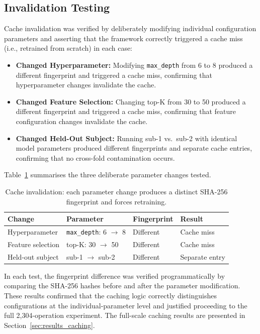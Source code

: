 \subsection{Invalidation Testing}

Cache invalidation was verified by deliberately modifying individual
configuration parameters and asserting that the framework correctly triggered
a cache miss (i.e., retrained from scratch) in each case:

\begin{itemize}
\item \textbf{Changed Hyperparameter:} Modifying \verb|max_depth| from 6 to 8
 produced a different fingerprint and triggered a cache miss, confirming
 that hyperparameter changes invalidate the cache.
\item \textbf{Changed Feature Selection:} Changing top-K from 30 to 50 produced
 a different fingerprint and triggered a cache miss, confirming that
 feature configuration changes invalidate the cache.
\item \textbf{Changed Held-Out Subject:} Running sub-1 vs.\ sub-2 with identical
 model parameters produced different fingerprints and separate cache entries,
 confirming that no cross-fold contamination occurs.
\end{itemize}

Table~\ref{tab:invalidation} summarises the three deliberate parameter
changes tested.

\begin{table}[htbp]
\centering
\caption[Cache invalidation tests]{Cache invalidation: each parameter change produces a distinct
SHA-256 fingerprint and forces retraining.}
\label{tab:invalidation}
\begin{tabular}{llll}
\toprule
\textbf{Change} & \textbf{Parameter} & \textbf{Fingerprint} & \textbf{Result} \\
\midrule
Hyperparameter & \texttt{max\_depth}: 6 $\to$ 8 & Different & Cache miss \\
Feature selection & top-K: 30 $\to$ 50 & Different & Cache miss \\
Held-out subject & sub-1 $\to$ sub-2 & Different & Separate entry \\
\bottomrule
\end{tabular}
\end{table}

In each test, the fingerprint difference was verified programmatically by
comparing the SHA-256 hashes before and after the parameter modification.
These results confirmed that the caching logic correctly distinguishes
configurations at the individual-parameter level and justified proceeding
to the full 2{,}304-operation experiment. The full-scale caching results
are presented in Section~\ref{sec:results_caching}.

